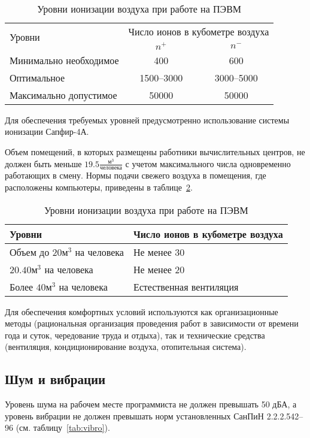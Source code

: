 \begin{table}[ht]
\caption{Уровни ионизации воздуха при работе на ПЭВМ}
\begin{tabular}{|l|c|c|}
\hline
\multirow{2}{*}{Уровни} & \multicolumn{2}{l|}{Число ионов в кубометре воздуха}\\
\cline{2-3}
&$n^+$&$n^-$\\
\hline
Минимально необходимое & 400 & 600 \\
\hline
Оптимальное & 1500--3000 & 3000--5000 \\
\hline
Максимально допустимое & 50000 & 50000 \\
\hline
\end{tabular}
\label{tab:ions}
\end{table}

Для обеспечения требуемых уровней предусмотренно использование системы ионизации Сапфир-4А.

Объем помещений, в которых размещены работники вычислительных центров, не должен быть меньше $19.5 \frac{\text{м}^3}{\text{человека}}$ с учетом максимального числа одновременно работающих в смену. Нормы подачи свежего воздуха в помещения, где расположены компьютеры, приведены в таблице~\ref{tab:air}.

\begin{table}[ht]
\caption{Уровни ионизации воздуха при работе на ПЭВМ}
	\begin{tabular}{|l|l|}
	\hline
	Уровни & Число ионов в кубометре воздуха \\ 
	\hline
	Объем до $20 {\text{м}^3}$ на человека & Не менее 30 \\
	\hline
	$20.40 {\text{м}^3}$ на человека & Не менее 20 \\
	\hline
	Более $40 {\text{м}^3}$ на человека & Естественная вентиляция \\
	\hline
	\end{tabular}
\label{tab:air}
\end{table}

Для обеспечения комфортных условий используются как организационные методы (рациональная организация проведения работ в зависимости от времени года и суток, чередование труда и отдыха), так и технические средства (вентиляция, кондиционирование воздуха, отопительная система).

\subsection{Шум и вибрации}

Уровень шума на рабочем месте программиста не должен превышать 50 дБА, а уровень вибрации не должен превышать норм установленных СанПиН 2.2.2.542--96 (см. таблицу~\ref{tab:vibro}).


